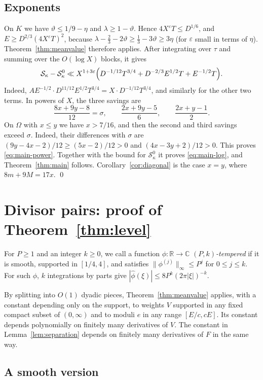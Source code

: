 \documentclass[11pt]{amsart}
\theoremstyle{definition}
\theoremstyle{remark}
\numberwithin{equation}{section}
\newcommand{\R}{\mathbb R}
\newcommand{\C}{\mathbb C}
\newcommand{\cS}{\mathcal S}
\newcommand{\eps}{\varepsilon}
\begin{document}
\subsection{Exponents}
On $K$ we have $\vartheta\le1/9-\eta$ and $\lambda\ge1-\vartheta$.  Hence
$4X^{\eps}T\le D^{1/6}$, and $E\ge D^{2/3}(4X^{\eps}T)^2$, because
$\lambda-\tfrac23-2\vartheta\ge\tfrac13-3\vartheta\ge3\eta$ (for $\eps$
small in terms of $\eta$).  Theorem~\ref{thm:meanvalue} therefore applies.
After integrating over $\tau$ and summing over the $O(\log X)$ blocks, it
gives
\[
 \cS_\kappa-\cS_\kappa^0\ll X^{1+3\eps}\Bigl(
 D^{-1/12}T^{3/4}+D^{-2/3}E^{1/2}T+E^{-1/2}T\Bigr).
\]
Indeed, $AE^{-1/2}\cdot D^{11/12}E^{1/2}T^{3/4}=X\cdot D^{-1/12}T^{3/4}$,
and similarly for the other two terms.  In powers of $X$, the three savings
are
\[
 \frac{8x+9y-8}{12}=\sigma,\qquad
 \frac{2x+9y-5}{6},\qquad
 \frac{2x+y-1}{2}.
\]
On $\Omega$ with $x\le y$ we have $x>7/16$, and then the second and third
savings exceed $\sigma$.  Indeed, their differences with $\sigma$ are
$(9y-4x-2)/12\ge(5x-2)/12>0$ and $(4x-3y+2)/12>0$.  This proves
\eqref{eq:main-power}.  Together with the bound for $\cS_\kappa^0$ it
proves \eqref{eq:main-log}, and Theorem~\ref{thm:main} follows.
Corollary~\ref{cor:diagonal} is the case $x=y$, where $8m+9M=17x$.
\qed

\section{Divisor pairs: proof of Theorem~\ref{thm:level}}\label{sec:level}

For $P\ge1$ and an integer $k\ge0$, we call a function $\phi\colon\R\to\C$
\emph{$(P,k)$-tempered} if it is smooth, supported in $[1/4,4]$, and
satisfies $\|\phi^{(j)}\|_\infty\le P^j$ for $0\le j\le k$.  For such $\phi$,
$k$ integrations by parts give $|\widehat\phi(\xi)|\le 8P^k(2\pi|\xi|)^{-k}$.

By splitting into $O(1)$ dyadic pieces, Theorem~\ref{thm:meanvalue}
applies, with a constant depending only on the support, to weights $V$
supported in any fixed compact subset of $(0,\infty)$ and to moduli $e$ in
any range $[E/c,cE]$.  Its constant depends polynomially on finitely many
derivatives of $V$.  The constant in Lemma~\ref{lem:separation} depends on
finitely many derivatives of $F$ in the same way.

\subsection{A smooth version}
\end{document}

